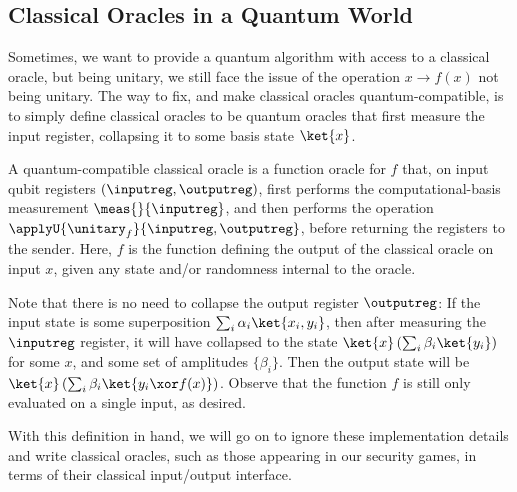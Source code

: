  \subsection{Classical Oracles in a Quantum World}
    Sometimes, we want to provide a quantum algorithm with access to a
      classical oracle, but being unitary, we still face the issue of
      the operation $x \longrightarrow f(x)$ not being unitary. The way to fix,
      and make classical oracles quantum-compatible, is to simply define
      classical oracles to be quantum oracles that first measure the input
      register, collapsing it to some basis state $\ket{x}$. 

    \begin{definition}
      A quantum-compatible classical oracle
        is a function oracle for $f$ that, on input qubit registers $(\inputreg, \outputreg)$,
        first performs the computational-basis measurement $\meas{}{\inputreg}$,
        and then performs the operation $\applyU{\unitary_f}{\inputreg,
        \outputreg}$, before returning the registers to the sender.
        Here, $f$ is the function defining the output of the classical oracle
        on input $x$, given any state and/or randomness internal to the oracle.
    \end{definition}

    \noindent
    Note that there is no need to collapse the output register $\outputreg$: If
      the input state is some superposition 
      $\sum_i \alpha_i \ket{x_i, y_i}$, then after measuring the $\inputreg$
      register, it will have collapsed to the state $\ket{x} \left( \sum_i
      \beta_i \ket{y_i} \right)$ for some $x$, and some set of amplitudes
      $\{\beta_i\}$. 
      Then the output state will be $\ket{x} \left( \sum_i \beta_i
      \ket{y_i \xor f(x)} \right)$. Observe that the function $f$ is still only
      evaluated on a single input, as desired.

    With this definition in hand, we will go on to ignore these implementation
      details and write classical oracles, such as those appearing in our
      security games, in terms of their classical input/output interface.

